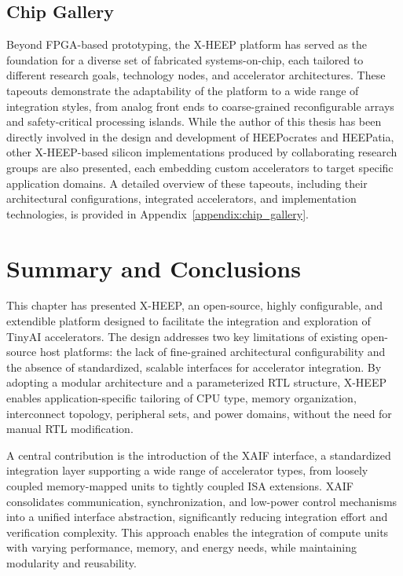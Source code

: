         \subsection{Chip Gallery}
            
            Beyond FPGA-based prototyping, the \mbox{X-HEEP} platform has served as the foundation for a diverse set of fabricated systems-on-chip, each tailored to different research goals, technology nodes, and accelerator architectures. These tapeouts demonstrate the adaptability of the platform to a wide range of integration styles, from analog front ends to coarse-grained reconfigurable arrays and safety-critical processing islands. While the author of this thesis has been directly involved in the design and development of \mbox{HEEPocrates} and \mbox{HEEPatia}, other \mbox{X-HEEP}-based silicon implementations produced by collaborating research groups are also presented, each embedding custom accelerators to target specific application domains. A detailed overview of these tapeouts, including their architectural configurations, integrated accelerators, and implementation technologies, is provided in Appendix~\ref{appendix:chip_gallery}.

    \section{Summary and Conclusions}
    \label{sec:conclusions}
    
        This chapter has presented \mbox{X-HEEP}, an open-source, highly configurable, and extendible platform designed to facilitate the integration and exploration of TinyAI accelerators. The design addresses two key limitations of existing open-source host platforms: the lack of fine-grained architectural configurability and the absence of standardized, scalable interfaces for accelerator integration. By adopting a modular architecture and a parameterized RTL structure, \mbox{X-HEEP} enables application-specific tailoring of CPU type, memory organization, interconnect topology, peripheral sets, and power domains, without the need for manual RTL modification.  
        
        A central contribution is the introduction of the XAIF interface, a standardized integration layer supporting a wide range of accelerator types, from loosely coupled memory-mapped units to tightly coupled ISA extensions. XAIF consolidates communication, synchronization, and low-power control mechanisms into a unified interface abstraction, significantly reducing integration effort and verification complexity. This approach enables the integration of compute units with varying performance, memory, and energy needs, while maintaining modularity and reusability.
        
